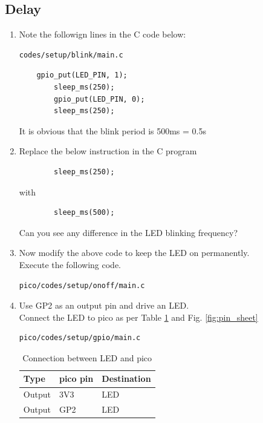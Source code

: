 \subsection{Delay}
\begin{enumerate}[label=\arabic*.,ref=\theenumi]
\item Note the followign lines in the C code below:
\begin{lstlisting}
codes/setup/blink/main.c
\end{lstlisting}
%
\begin{lstlisting}
	gpio_put(LED_PIN, 1);
        sleep_ms(250);
        gpio_put(LED_PIN, 0);
        sleep_ms(250);
\end{lstlisting}
%
It is obvious that the blink period is 500ms = 0.5s
\item Replace the below instruction in the C program
\begin{lstlisting}
        sleep_ms(250);
\end{lstlisting}
%
with
\begin{lstlisting}
        sleep_ms(500);
\end{lstlisting}
Can you see any difference in the LED blinking frequency?

\item Now modify the above code to keep the LED on permanently.
\\
\solution Execute the following code.
\begin{lstlisting}
pico/codes/setup/onoff/main.c
\end{lstlisting}
\item Use GP2 as an output pin and drive an LED.
\\
\solution  Connect the LED to pico as per Table \ref{table:setup_led} and Fig. \ref{fig:pin_sheet}

\begin{lstlisting}
pico/codes/setup/gpio/main.c
\end{lstlisting}

\begin{table}[!ht]
\centering
\begin{tabular}{|l|l|l|}
\hline
Type & pico  pin  &  Destination \\ \hline
Output &  3V3 &  LED\\ \hline
Output  & GP2  &  LED\\ \hline
\end{tabular}
\caption{Connection between LED and pico}
\label{table:setup_led}
\end{table}


\end{enumerate}
